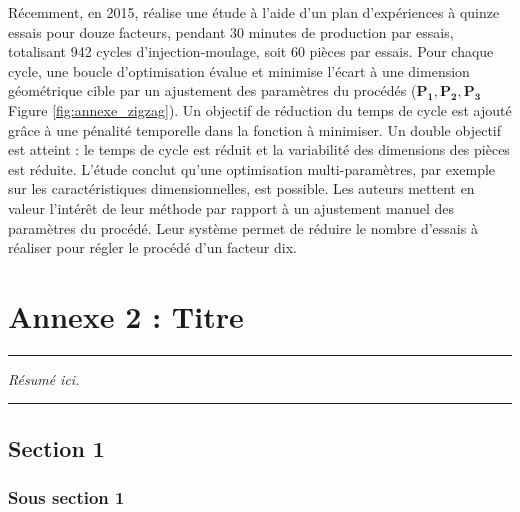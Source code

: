Récemment, en 2015, \cite{johnston_-line_2015} réalise une étude à l'aide d'un plan d'expériences à quinze essais pour douze facteurs, pendant 30 minutes de production par essais, totalisant 942 cycles d'injection-moulage, soit 60 pièces par essais.
Pour chaque cycle, une boucle d'optimisation évalue et minimise l'écart à une dimension géométrique cible par un ajustement des paramètres du procédés ($\boldsymbol{P_1, P_2, P_3}$ Figure \ref{fig:annexe_zigzag}).
Un objectif de réduction du temps de cycle est ajouté grâce à une pénalité temporelle dans la fonction à minimiser.
Un double objectif est atteint : le temps de cycle est réduit et la variabilité des dimensions des pièces est réduite.
L'étude conclut qu’une optimisation  multi-paramètres, par exemple sur les caractéristiques dimensionnelles, est possible.
Les auteurs mettent en valeur l'intérêt de leur méthode par rapport à un ajustement manuel des paramètres du procédé.
Leur système permet de réduire le nombre d'essais à réaliser pour régler le procédé d'un facteur dix.




\FloatBarrier
\chapter{Annexe 2 : Titre}
\label{Ann:2}


\begin{center}
\rule{0.7\linewidth}{.5pt}
\begin{minipage}{0.7\linewidth}
\smallskip

\textit{Résumé ici.
}

\end{minipage}
\smallskip
\rule{0.7\linewidth}{.5pt}
\end{center}

\minitoc
\newpage


\section{Section 1}
\subsection{Sous section 1}
\blindtext
